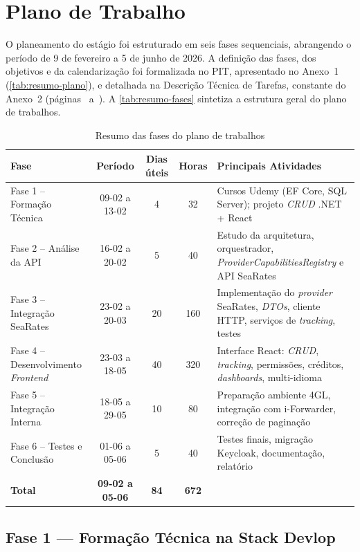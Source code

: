 \documentclass[a4paper,12pt]{report}
\begin{document}
\section{Plano de Trabalho}

O planeamento do estágio foi estruturado em seis fases sequenciais, abrangendo o período de 9 de fevereiro a 5 de junho de 2026. A definição das fases, dos objetivos e da calendarização foi formalizada no PIT, apresentado no Anexo~1 (\autoref{tab:resumo-plano}), e detalhada na Descrição Técnica de Tarefas, constante do Anexo~2 (páginas~\pageref{fig:tarefas-pag1} a~\pageref{fig:tarefas-pag5}). A \autoref{tab:resumo-fases} sintetiza a estrutura geral do plano de trabalhos.

\begin{table}[H]
\centering
\caption{Resumo das fases do plano de trabalhos}
\label{tab:resumo-fases}
\small
\begin{tabular}{|p{}|c|c|c|p{}|}
\hline
\textbf{Fase} & \textbf{Período} & \textbf{Dias úteis} & \textbf{Horas} & \textbf{Principais Atividades} \\
\hline
Fase 1 -- Formação Técnica & 09-02 a 13-02 & 4 & 32 & Cursos Udemy (EF Core, SQL Server); projeto \textit{CRUD} .NET + React \\
\hline
Fase 2 -- Análise da API & 16-02 a 20-02 & 5 & 40 & Estudo da arquitetura, orquestrador, \textit{ProviderCapabilitiesRegistry} e API SeaRates \\
\hline
Fase 3 -- Integração SeaRates & 23-02 a 20-03 & 20 & 160 & Implementação do \textit{provider} SeaRates, \textit{DTOs}, cliente HTTP, serviços de \textit{tracking}, testes \\
\hline
Fase 4 -- Desenvolvimento \textit{Frontend} & 23-03 a 18-05 & 40 & 320 & Interface React: \textit{CRUD}, \textit{tracking}, permissões, créditos, \textit{dashboards}, multi-idioma \\
\hline
Fase 5 -- Integração Interna & 18-05 a 29-05 & 10 & 80 & Preparação ambiente 4GL, integração com i-Forwarder, correção de paginação \\
\hline
Fase 6 -- Testes e Conclusão & 01-06 a 05-06 & 5 & 40 & Testes finais, migração Keycloak, documentação, relatório \\
\hline
\textbf{Total} & \textbf{09-02 a 05-06} & \textbf{84} & \textbf{672} & \\
\hline
\end{tabular}
\end{table}

\subsection{Fase 1 --- Formação Técnica na Stack Devlop}
\end{document}
